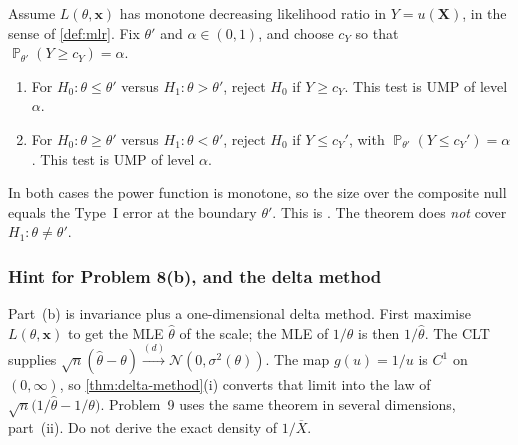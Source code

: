 \documentclass[11pt,a4paper]{article}
\DeclareMathOperator{\Pbb}{\mathbb{P}}
\begin{document}
\begin{theorem}
\label{thm:karlin-rubin}
Assume \( L(\theta,\mathbf{x}) \) has monotone decreasing likelihood ratio in \( Y=u(\mathbf{X}) \), in the sense of \cref{def:mlr}. Fix \( \theta' \) and \( \alpha\in(0,1) \), and choose \( c_Y \) so that \( \Pbb_{\theta'}(Y\ge c_Y)=\alpha \).
\begin{enumerate}[label=\textup{(\roman*)}]
    \item
    For \( H_0:\theta\le\theta' \) versus \( H_1:\theta>\theta' \), reject \( H_0 \) if \( Y\ge c_Y \). This test is UMP of level \( \alpha \).
    \item
    For \( H_0:\theta\ge\theta' \) versus \( H_1:\theta<\theta' \), reject \( H_0 \) if \( Y\le c_Y' \), with \( \Pbb_{\theta'}(Y\le c_Y')=\alpha \). This test is UMP of level \( \alpha \).
\end{enumerate}
In both cases the power function is monotone, so the size over the composite null equals the Type~I error at the boundary \( \theta' \). This is \citep[(8.2.3), (8.2.6)]{hogg2019}. The theorem does \emph{not} cover \( H_1:\theta\neq\theta' \).
\end{theorem}

\subsubsection{Hint for Problem 8(b), and the delta method}

Part~(b) is invariance plus a one-dimensional delta method. First maximise \( L(\theta,\mathbf{x}) \) to get the MLE \( \hat{\theta} \) of the scale; the MLE of \( 1/\theta \) is then \( 1/\hat{\theta} \). The CLT supplies \( \sqrt{n}(\hat{\theta}-\theta)\xrightarrow{(d)}\mathcal{N}(0,\sigma^{2}(\theta)) \). The map \( g(u)=1/u \) is \( C^{1} \) on \( (0,\infty) \), so \cref{thm:delta-method}(i) converts that limit into the law of \( \sqrt{n}\bigl(1/\hat{\theta}-1/\theta\bigr) \). Problem~9 uses the same theorem in several dimensions, part~(ii). Do not derive the exact density of \( 1/\overline{X} \).
\end{document}
